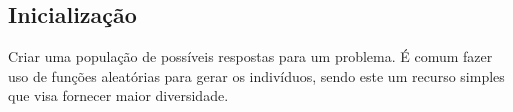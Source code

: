 \begin{minipage}{\linewidth}
    \label{fig:EstruturaAG}
\end{minipage}


\subsection{Inicialização}
Criar uma população de possíveis respostas para um problema. 
É comum fazer uso de funções aleatórias para gerar os indivíduos, sendo este um recurso simples que visa fornecer maior diversidade.

